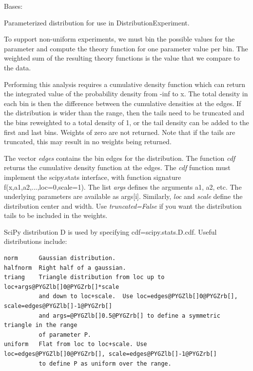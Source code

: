 \documentclass[letterpaper,10pt,english]{sphinxmanual}
\begin{document}
\begin{fulllineitems}
\label{api/dist:refl1d.dist.Weights}
Bases: 

Parameterized distribution for use in DistributionExperiment.

To support non-uniform experiments, we must bin the possible values
for the parameter and compute the theory function for one parameter
value per bin.  The weighted sum of the resulting theory functions
is the value that we compare to the data.

Performing this analysis requires a cumulative density function which
can return the integrated value of the probability density from -inf
to x.  The total density in each bin is then the difference between
the cumulative densities at the edges.  If the distribution is wider
than the range, then the tails need to be truncated and the bins
reweighted to a total density of 1, or the tail density can be added
to the first and last bins.  Weights of zero are not returned.  Note
that if the tails are truncated, this may result in no weights being
returned.

The vector \emph{edges} contains the bin edges for the distribution.  The
function \emph{cdf} returns the cumulative density function at the edges.
The \emph{cdf} function must implement the scipy.stats interface, with
function signature f(x,a1,a2,...,loc=0,scale=1).  The list \emph{args}
defines the arguments a1, a2, etc.  The underlying parameters are
available as args{[}i{]}.  Similarly, \emph{loc} and \emph{scale} define the
distribution center and width.  Use \emph{truncated=False} if you want
the distribution tails to be included in the weights.

SciPy distribution D is used by specifying cdf=scipy.stats.D.cdf.
Useful distributions include:

\begin{Verbatim}[commandchars=@\[\]]
norm      Gaussian distribution.
halfnorm  Right half of a gaussian.
triang    Triangle distribution from loc up to loc+args@PYGZlb[]0@PYGZrb[]*scale
          and down to loc+scale.  Use loc=edges@PYGZlb[]0@PYGZrb[], scale=edges@PYGZlb[]-1@PYGZrb[]
          and args=@PYGZlb[]0.5@PYGZrb[] to define a symmetric triangle in the range
          of parameter P.
uniform   Flat from loc to loc+scale. Use loc=edges@PYGZlb[]0@PYGZrb[], scale=edges@PYGZlb[]-1@PYGZrb[]
          to define P as uniform over the range.
\end{Verbatim}

\begin{fulllineitems}
\label{api/dist:refl1d.dist.Weights.parameters}
\end{fulllineitems}


\end{fulllineitems}
\end{document}
